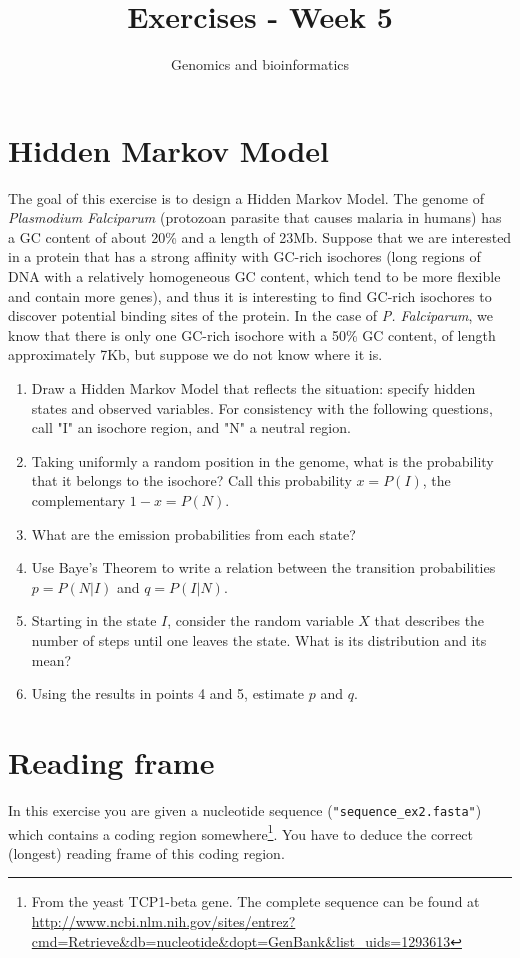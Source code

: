 \documentclass[a4paper,11pt]{article}
\title{Exercises - Week 5}
\date{}
\author{Genomics and bioinformatics}
\begin{document}
\maketitle

\section{Hidden Markov Model}
The goal of this exercise is to design a Hidden Markov Model. The genome of \emph{Plasmodium Falciparum} (protozoan parasite that causes malaria in humans) has a GC content of about 20\% and a length of 23Mb. Suppose that we are interested in a protein that has a strong affinity with GC-rich isochores (long regions of DNA with a relatively homogeneous GC content, which tend to be more flexible and contain more genes), and thus it is interesting to find GC-rich isochores to discover potential binding sites of the protein. In the case of \emph{P. Falciparum}, we know that there is only one GC-rich isochore with a 50\% GC content, of length approximately 7Kb, but suppose we do not know where it is.
\begin{enumerate}
\item Draw a Hidden Markov Model that reflects the situation: specify hidden states and observed variables. For consistency with the following questions, call "I" an isochore region, and "N" a neutral region.
\item Taking uniformly a random position in the genome, what is the probability that it belongs to the isochore? Call this probability $x = P(I)$, the complementary $1-x = P(N)$.
\item What are the emission probabilities from each state?
\item Use Baye's Theorem to write a relation between the transition probabilities $p=P(N | I)$ and $q = P(I | N)$.
\item Starting in the state $I$, consider the random variable $X$ that describes the number of steps until one leaves the state. What is its distribution and its mean?
\item Using the results in points 4 and 5, estimate $p$ and $q$.
\end{enumerate}

\section{Reading frame}
In this exercise you are given a nucleotide sequence (\texttt{"sequence\_ex2.fasta"}) which contains a coding region somewhere\footnote{From the yeast TCP1-beta gene. The complete sequence can be found at \url{http://www.ncbi.nlm.nih.gov/sites/entrez?cmd=Retrieve&db=nucleotide&dopt=GenBank&list_uids=1293613}}. You have to deduce the correct (longest) reading frame of this coding region.
\end{document}
